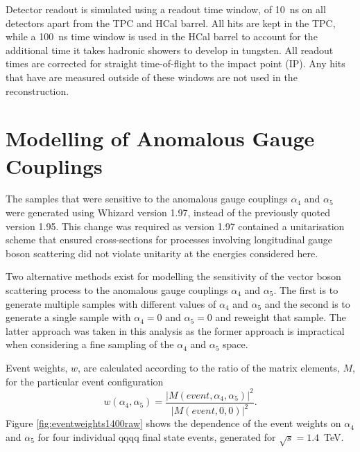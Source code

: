 Detector readout is simulated using a readout time window, of 10~ns on all detectors apart from the TPC and HCal barrel.  All hits are kept in the TPC, while a 100~ns time window is used in the HCal barrel to account for the additional time it takes hadronic showers to develop in tungsten.  All readout times are corrected for straight time-of-flight to the impact point (IP).  Any hits that have are measured outside of these windows are not used in the reconstruction.   
 

\section{Modelling of Anomalous Gauge Couplings}
\label{sec:modellingofanomalouscouplings}
The samples that were sensitive to the anomalous gauge couplings $\alpha_{4}$ and $\alpha_{5}$ were generated using Whizard version 1.97, instead of the previously quoted version 1.95.  This change was required as version 1.97 contained a unitarisation scheme that ensured cross-sections for processes involving longitudinal gauge boson scattering did not violate unitarity at the energies considered here.  

Two alternative methods exist for modelling the sensitivity of the vector boson scattering process to the anomalous gauge couplings $\alpha_{4}$ and $\alpha_{5}$.  The first is to generate multiple samples with different values of $\alpha_{4}$ and $\alpha_{5}$ and the second is to generate a single sample with $\alpha_{4} = 0$ and $\alpha_{5} = 0$ and reweight that sample.  The latter approach was taken in this analysis as the former approach is impractical when considering a fine sampling of the $\alpha_{4}$ and $\alpha_{5}$ space.

Event weights, $w$, are calculated according to the ratio of the matrix elements, $M$, for the particular event configuration \cite{WhizardManual}
%
\begin{equation}
w(\alpha_{4},\alpha_{5}) = \frac{|M(event,\alpha_{4},\alpha_{5})|^{2}}{|M(event,0,0)|^{2}} \text{.}
\end{equation}
%
Figure \ref{fig:eventweights1400raw} shows the dependence of the event weights on $\alpha_{4}$ and $\alpha_{5}$ for four individual \nu{\nu}qqqq final state events, generated for $\sqrt{s}=1.4$~TeV.

